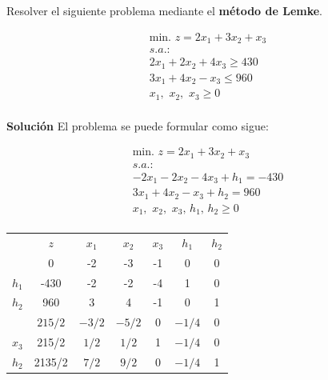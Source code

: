Resolver el siguiente problema mediante el \textbf{método de Lemke}.

\begin{equation}
\begin{split}
\mbox{min. } z = 2x_1 + 3x_2 + x_3\\
s.a.:\\
2x_1 + 2x_2 + 4x_3 \geq 430\\
3x_1 + 4x_2 - x_3 \leq 960\\
x_1,\,\,x_2,\,\,x_3\geq 0\\
\end{split}
\end{equation}

\noindent

\textbf{Solución}
El problema se puede formular como sigue:

\begin{equation}
\begin{split}
\mbox{min. } z = 2x_1 + 3x_2 + x_3\\
s.a.:\\
-2x_1 - 2x_2 - 4x_3 + h_1 = -430\\
3x_1 + 4x_2 - x_3 + h_2 = 960\\
x_1,\,\,x_2,\,\,x_3,\,h_1,\,h_2\geq 0\\
\end{split}
\end{equation}

\begin{center}
\begin{tabular}{c|c|ccccc|}
 & $z$ & $x_1$ & $x_2$ & $x_3$ & $h_1$ & $h_2$\\ 
 & 0 & -2 & -3 & -1 & 0 & 0 \\ 
\hline
$h_1$ & -430  & -2 & -2 & -4 & 1 & 0\\ 
$h_2$ & 960  & 3 & 4 & -1 & 0 & 1\\ 
\hline
 & $215/2$ & $-3/2$ & $-5/2$ & 0 & $-1/4$ & 0 \\ 
\hline
$x_3$ & 215/2  & $1/2$ & $1/2$ & 1 & $-1/4$ & 0\\ 
$h_2$ & 2135/2  & $7/2$ & $9/2$ & 0 & $-1/4$ & 1\\ 
\hline
\end{tabular}
\end{center}
